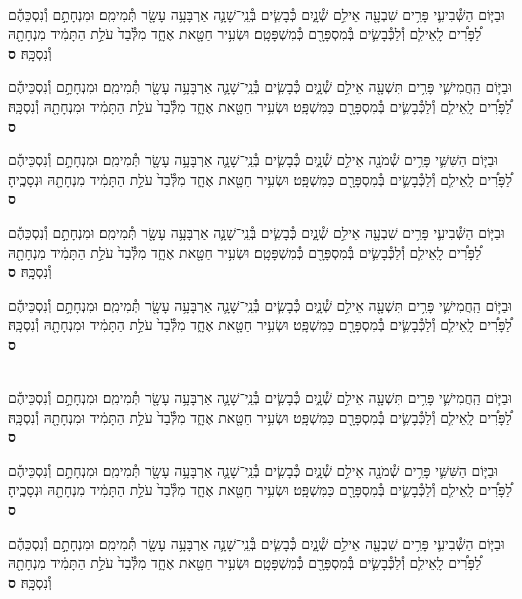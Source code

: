 \documentclass[twoside, openany, parskip=half, 11pt]{book}
\begin{document}
\begin{footnotesize}
\begin{multicols}{2}
\\
וּבַיּ֧וֹם הַשְּׁ֯בִיעִ֛י פָּרִ֥ים שִׁבְעָ֖ה אֵילִ֣ם שְׁ֯נָ֑יִם כְּ֯בָשִׂ֧ים בְּ֯נֵֽי־שָׁנָ֛ה אַרְבָּעָ֥ה עָשָׂ֖ר תְּ֯מִימִֽם׃ וּמִנְחָתָ֣ם וְ֯נִסְכֵּהֶ֡ם לַ֠פָּרִ֠ים לָֽאֵילִ֧ם וְ֯לַכְּ֯בָשִׂ֛ים בְּ֯מִסְפָּרָ֖ם כְּ֯מִשְׁפָּטָֽם׃ וּשְׂעִ֥יר חַטָּ֖את אֶחָ֑ד מִלְּ֯בַד֙ עֹלַ֣ת הַתָּמִ֔יד מִנְחָתָ֖הּ וְ֯נִסְכָּֽהּ׃ \textbf{ס}

וּבַיּ֧וֹם הַֽחֲמִישִׁ֛י פָּרִ֥ים תִּשְׁעָ֖ה אֵילִ֣ם שְׁ֯נָ֑יִם כְּ֯בָשִׂ֧ים בְּ֯נֵֽי־שָׁנָ֛ה אַרְבָּעָ֥ה עָשָׂ֖ר תְּ֯מִימִֽם׃ וּמִנְחָתָ֣ם וְ֯נִסְכֵּיהֶ֡ם לַ֠פָּרִ֠ים לָֽאֵילִ֧ם וְ֯לַכְּ֯בָשִׂ֛ים בְּ֯מִסְפָּרָ֖ם כַּמִּשְׁפָּֽט׃ וּשְׂעִ֥יר חַטָּ֖את אֶחָ֑ד מִלְּ֯בַד֙ עֹלַ֣ת הַתָּמִ֔יד וּמִנְחָתָ֖הּ וְ֯נִסְכָּֽהּ׃ \textbf{ס}

וּבַיּ֧וֹם הַשִּׁשִּׁ֛י פָּרִ֥ים שְׁ֯מֹנָ֖ה אֵילִ֣ם שְׁ֯נָ֑יִם כְּ֯בָשִׂ֧ים בְּ֯נֵֽי־שָׁנָ֛ה אַרְבָּעָ֥ה עָשָׂ֖ר תְּ֯מִימִֽם׃ וּמִנְחָתָ֣ם וְ֯נִסְכֵּיהֶ֡ם לַ֠פָּרִ֠ים לָֽאֵילִ֧ם וְ֯לַכְּ֯בָשִׂ֛ים בְּ֯מִסְפָּרָ֖ם כַּמִּשְׁפָּֽט׃ וּשְׂעִ֥יר חַטָּ֖את אֶחָ֑ד מִלְּ֯בַד֙ עֹלַ֣ת הַתָּמִ֔יד מִנְחָתָ֖הּ וּנְסָכֶֽיהָ׃ \textbf{ס}\

וּבַיּ֧וֹם הַשְּׁ֯בִיעִ֛י פָּרִ֥ים שִׁבְעָ֖ה אֵילִ֣ם שְׁ֯נָ֑יִם כְּ֯בָשִׂ֧ים בְּ֯נֵֽי־שָׁנָ֛ה אַרְבָּעָ֥ה עָשָׂ֖ר תְּ֯מִימִֽם׃ וּמִנְחָתָ֣ם וְ֯נִסְכֵּהֶ֡ם לַ֠פָּרִ֠ים לָֽאֵילִ֧ם וְ֯לַכְּ֯בָשִׂ֛ים בְּ֯מִסְפָּרָ֖ם כְּ֯מִשְׁפָּטָֽם׃ וּשְׂעִ֥יר חַטָּ֖את אֶחָ֑ד מִלְּ֯בַד֙ עֹלַ֣ת הַתָּמִ֔יד מִנְחָתָ֖הּ וְ֯נִסְכָּֽהּ׃ \textbf{ס}

וּבַיּ֧וֹם הַֽחֲמִישִׁ֛י פָּרִ֥ים תִּשְׁעָ֖ה אֵילִ֣ם שְׁ֯נָ֑יִם כְּ֯בָשִׂ֧ים בְּ֯נֵֽי־שָׁנָ֛ה אַרְבָּעָ֥ה עָשָׂ֖ר תְּ֯מִימִֽם׃ וּמִנְחָתָ֣ם וְ֯נִסְכֵּיהֶ֡ם לַ֠פָּרִ֠ים לָֽאֵילִ֧ם וְ֯לַכְּ֯בָשִׂ֛ים בְּ֯מִסְפָּרָ֖ם כַּמִּשְׁפָּֽט׃ וּשְׂעִ֥יר חַטָּ֖את אֶחָ֑ד מִלְּ֯בַד֙ עֹלַ֣ת הַתָּמִ֔יד וּמִנְחָתָ֖הּ וְ֯נִסְכָּֽהּ׃ \textbf{ס}

\\
וּבַיּ֧וֹם הַֽחֲמִישִׁ֛י פָּרִ֥ים תִּשְׁעָ֖ה אֵילִ֣ם שְׁ֯נָ֑יִם כְּ֯בָשִׂ֧ים בְּ֯נֵֽי־שָׁנָ֛ה אַרְבָּעָ֥ה עָשָׂ֖ר תְּ֯מִימִֽם׃ וּמִנְחָתָ֣ם וְ֯נִסְכֵּיהֶ֡ם לַ֠פָּרִ֠ים לָֽאֵילִ֧ם וְ֯לַכְּ֯בָשִׂ֛ים בְּ֯מִסְפָּרָ֖ם כַּמִּשְׁפָּֽט׃ וּשְׂעִ֥יר חַטָּ֖את אֶחָ֑ד מִלְּ֯בַד֙ עֹלַ֣ת הַתָּמִ֔יד וּמִנְחָתָ֖הּ וְ֯נִסְכָּֽהּ׃ \textbf{ס}

וּבַיּ֧וֹם הַשִּׁשִּׁ֛י פָּרִ֥ים שְׁ֯מֹנָ֖ה אֵילִ֣ם שְׁ֯נָ֑יִם כְּ֯בָשִׂ֧ים בְּ֯נֵֽי־שָׁנָ֛ה אַרְבָּעָ֥ה עָשָׂ֖ר תְּ֯מִימִֽם׃ וּמִנְחָתָ֣ם וְ֯נִסְכֵּיהֶ֡ם לַ֠פָּרִ֠ים לָֽאֵילִ֧ם וְ֯לַכְּ֯בָשִׂ֛ים בְּ֯מִסְפָּרָ֖ם כַּמִּשְׁפָּֽט׃ וּשְׂעִ֥יר חַטָּ֖את אֶחָ֑ד מִלְּ֯בַד֙ עֹלַ֣ת הַתָּמִ֔יד מִנְחָתָ֖הּ וּנְסָכֶֽיהָ׃ \textbf{ס}

וּבַיּ֧וֹם הַשְּׁ֯בִיעִ֛י פָּרִ֥ים שִׁבְעָ֖ה אֵילִ֣ם שְׁ֯נָ֑יִם כְּ֯בָשִׂ֧ים בְּ֯נֵֽי־שָׁנָ֛ה אַרְבָּעָ֥ה עָשָׂ֖ר תְּ֯מִימִֽם׃ וּמִנְחָתָ֣ם וְ֯נִסְכֵּהֶ֡ם לַ֠פָּרִ֠ים לָֽאֵילִ֧ם וְ֯לַכְּ֯בָשִׂ֛ים בְּ֯מִסְפָּרָ֖ם כְּ֯מִשְׁפָּטָֽם׃ וּשְׂעִ֥יר חַטָּ֖את אֶחָ֑ד מִלְּ֯בַד֙ עֹלַ֣ת הַתָּמִ֔יד מִנְחָתָ֖הּ וְ֯נִסְכָּֽהּ׃ \textbf{ס}


\end{multicols}
\end{footnotesize}
\end{document}
